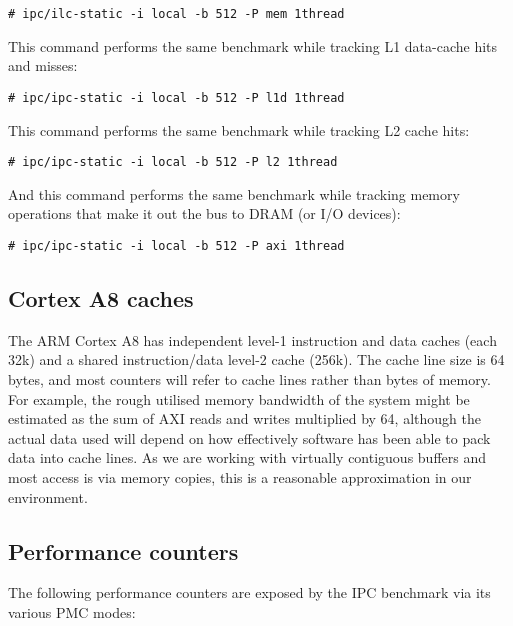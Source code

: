 \documentclass[a4paper,10pt]{article}
\begin{document}
\begin{verbatim}
# ipc/ilc-static -i local -b 512 -P mem 1thread
\end{verbatim}

\noindent
This command performs the same benchmark while tracking L1 data-cache hits and
misses:

\begin{verbatim}
# ipc/ipc-static -i local -b 512 -P l1d 1thread
\end{verbatim}

\noindent
This command performs the same benchmark while tracking L2 cache hits:

\begin{verbatim}
# ipc/ipc-static -i local -b 512 -P l2 1thread
\end{verbatim}

\noindent
And this command performs the same benchmark while tracking memory operations
that make it out the bus to DRAM (or I/O devices):

\begin{verbatim}
# ipc/ipc-static -i local -b 512 -P axi 1thread
\end{verbatim}

\subsection*{Cortex A8 caches}

The ARM Cortex A8 has independent level-1 instruction and data caches (each
32k) and a shared instruction/data level-2 cache (256k).
The cache line size is 64 bytes, and most counters will refer to cache lines
rather than bytes of memory.
For example, the rough utilised memory bandwidth of the system might be
estimated as the sum of AXI reads and writes multiplied by 64, although the
actual data used will depend on how effectively software has been able to pack
data into cache lines.
As we are working with virtually contiguous buffers and most access is via
memory copies, this is a reasonable approximation in our environment.

\subsection*{Performance counters}

The following performance counters are exposed by the IPC benchmark via its
various PMC modes:
\end{document}
